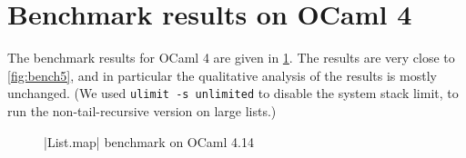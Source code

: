 \section{Benchmark results on OCaml 4}

The benchmark results for OCaml 4 are given in \cref{fig:bench4}. The
results are very close to \cref{fig:bench5}, and in particular the
qualitative analysis of the results is mostly unchanged. (We used
\texttt{ulimit -s unlimited} to disable the system stack limit, to run
the non-tail-recursive version on large lists.)

\begin{figure}[tp]
\def\svgscale{0.8}
\graphicspath{{plots/}}

\caption{\ocaml|List.map| benchmark on OCaml 4.14}
\label{fig:bench4}
\end{figure}

